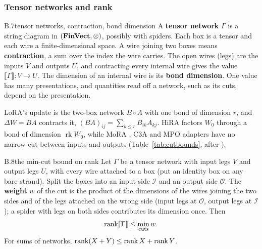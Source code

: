 \subsubsection*{Tensor networks and rank}

\begin{bgentry}{B.7}{tensor networks, contraction, bond dimension}
A \textbf{tensor network} $\Gamma$ is a string diagram in $(\mathbf{FinVect},\otimes)$, possibly with spiders. Each box is a
tensor and each wire a finite-dimensional space. A wire joining two boxes means \textbf{contraction}, a sum over the index
the wire carries. The open wires (legs) are the inputs $V$ and outputs $U$, and contracting every internal wire gives the
value $\llbracket\Gamma\rrbracket:V\to U$. The dimension of an internal wire is its \textbf{bond dimension}. One value has
many presentations, and quantities read off a network, such as its cuts, depend on the presentation.
\end{bgentry}

LoRA's update is the two-box network $B\circ A$ with one bond of dimension $r$, and $\Delta W=BA$ contracts it,
$(BA)_{ij}=\sum_{k\le r}B_{ik}A_{kj}$. HiRA factors $W_0$ through a bond of dimension $\operatorname{rk}W_0$, while MoRA
\citep{jiang2024mora}, C3A \citep{chen2024parameter} and MPO adapters have no narrow cut between inputs and outputs
(Table~\ref{tab:cutbounds}, after ).


\begin{bgfact}{B.8}{the min-cut bound on rank}
Let $\Gamma$ be a tensor network with input legs $V$ and output legs $U$, with every wire attached to a box (put an
identity box on any bare strand). Split the boxes into an input side $\mathcal I$ and an output side $\mathcal O$. The
\textbf{weight} $w$ of the cut is the product of the dimensions of the wires joining the two sides and of the legs attached
on the wrong side (input legs at $\mathcal O$, output legs at $\mathcal I$); a spider with legs on both sides contributes
its dimension once. Then
\begin{equation*}
  \operatorname{rank}\llbracket\Gamma\rrbracket\le\min_{\text{cuts}}w.
\end{equation*}
For sums of networks, $\operatorname{rank}(X+Y)\le\operatorname{rank} X+\operatorname{rank} Y$.
\end{bgfact}

